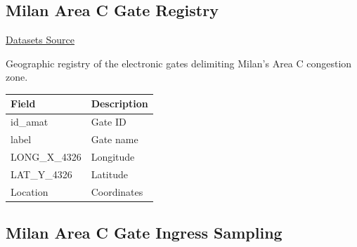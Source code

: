 \documentclass{article}
\begin{document}
	\subsection{Milan Area C Gate Registry}
	
	\href{https://dati.comune.milano.it/dataset/ds82_infogeo_varchi_elettronici_localizzazione_}{Datasets Source}
	
	Geographic registry of the electronic gates delimiting Milan's Area C congestion zone.
	
	\begin{table}[H]
		\centering
		\begin{tabular}{ll}
			\hline
			Field & Description \\
			\hline
			id\_amat & Gate ID \\
			label & Gate name \\
			LONG\_X\_4326 & Longitude \\
			LAT\_Y\_4326 & Latitude \\
			Location & Coordinates \\
			\hline
		\end{tabular}
	\end{table}
	
	\subsection{Milan Area C Gate Ingress Sampling}
	
\end{document}
